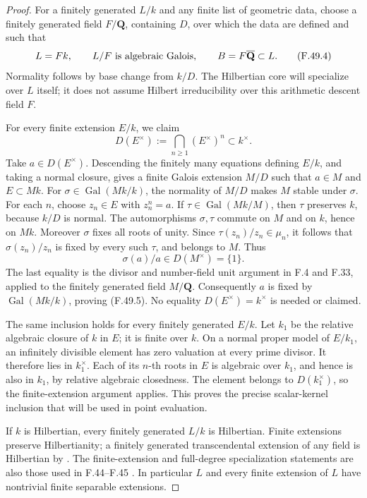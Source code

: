 \begin{proof}
For a finitely generated \(L/k\) and any finite list of geometric
data, choose a finitely generated field \(F/\mathbf Q\), containing
\(D\), over which the data are defined and such that
\[
 L=Fk,\qquad L/F\ \hbox{is algebraic Galois},\qquad
 B=F\overline{\mathbf Q}\subset L.
 \tag{F.49.4}
\]
Normality follows by base change from \(k/D\).
The Hilbertian core will specialize over \(L\) itself; it does not
assume Hilbert irreducibility over this arithmetic descent field \(F\).

For every finite extension \(E/k\), we claim
\[
 D(E^\times):=\bigcap_{n\ge1}(E^\times)^n\subset k^\times.
 \tag{F.49.5}
\]
Take \(a\in D(E^\times)\). Descending the finitely many equations
defining \(E/k\), and taking a normal closure, gives a finite Galois
extension \(M/D\) such that \(a\in M\) and \(E\subset Mk\).
For \(\sigma\in\operatorname{Gal}(Mk/k)\), the normality of \(M/D\)
makes \(M\) stable under \(\sigma\). For each \(n\), choose
\(z_n\in E\) with \(z_n^n=a\). If
\(\tau\in\operatorname{Gal}(Mk/M)\), then \(\tau\) preserves \(k\),
because \(k/D\) is normal. The automorphisms \(\sigma,\tau\) commute
on \(M\) and on \(k\), hence on \(Mk\). Moreover \(\sigma\) fixes
all roots of unity. Since \(\tau(z_n)/z_n\in\mu_n\), it follows that
\(\sigma(z_n)/z_n\) is fixed by every such \(\tau\), and belongs to
\(M\). Thus
\[
                 \sigma(a)/a\in D(M^\times)=\{1\}.
\]
The last equality is the divisor and number-field unit argument
in F.4 and F.33, applied to the finitely generated field \(M/\mathbf Q\).
Consequently \(a\) is fixed by \(\operatorname{Gal}(Mk/k)\), proving
(F.49.5). No equality \(D(E^\times)=k^\times\) is needed or claimed.

The same inclusion holds for every finitely generated \(E/k\).
Let \(k_1\) be the relative algebraic closure of \(k\) in \(E\);
it is finite over \(k\). On a normal proper model of \(E/k_1\),
an infinitely divisible element has zero valuation at every prime
divisor. It therefore lies in \(k_1^\times\). Each of its \(n\)-th
roots in \(E\) is algebraic over \(k_1\), and hence is also in \(k_1\),
by relative algebraic closedness. The element belongs to
\(D(k_1^\times)\), so the finite-extension argument applies.
This proves the precise scalar-kernel inclusion that will be used
in point evaluation.

If \(k\) is Hilbertian, every finitely generated \(L/k\) is Hilbertian.
Finite extensions preserve Hilbertianity; a finitely generated
transcendental extension of any field is Hilbertian by
\citet[Theorem~1.2 and Corollary~3.2]{F_BarySorokerParan2013}.
The finite-extension and full-degree specialization statements are
also those used in F.44--F.45
\citep[Proposition~3.3.1 and Theorem~3.4.1]{F_Serre2007}.
In particular \(L\) and every finite extension of \(L\) have
nontrivial finite separable extensions.


\end{proof}

